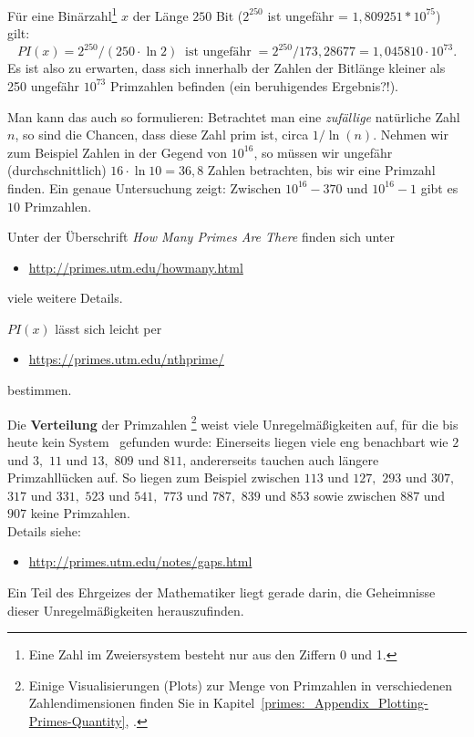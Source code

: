\begin{refsegment}
Für eine Binärzahl\footnote{%
Eine Zahl im Zweiersystem besteht nur aus den Ziffern 0 und 1.
}
$ x $ der Länge $250$ Bit
($2^{250}$ ist ungefähr = $1,809 251 * 10^{75}$)
gilt:
$$ PI(x) = 2^{250} / (250 \cdot \ln 2) \; \;  \mbox{ist~ungefähr}
\; = 2^{250} / 173,28677 = 1,045 810 \cdot 10^{73}. $$
Es ist also zu erwarten, dass sich innerhalb der Zahlen der
Bitlänge kleiner als 250 ungefähr $10^{73}$ Primzahlen
befinden (ein beruhigendes Ergebnis?!).

Man kann das auch so formulieren: Betrachtet man eine {\em zufällige} natürliche Zahl $n$, so sind die
Chancen, dass diese Zahl prim ist, circa $1 / \ln(n)$. Nehmen wir zum Beispiel Zahlen in der Gegend von
$10^{16}$, so müssen wir ungefähr (durchschnittlich) $ 16 \cdot \ln 10 = 36,8 $
Zahlen betrachten, bis wir eine Primzahl finden.
Ein genaue Untersuchung zeigt: Zwischen $10^{16}-370$ und $10^{16}-1$ gibt es $10$
Primzahlen.

Unter der Überschrift {\em How Many Primes Are There} finden sich unter
\vspace{-10pt}
\begin{itemize}
  \item[] \url{http://primes.utm.edu/howmany.html}
\end{itemize}
\vspace{-10pt}
viele weitere Details.

$PI(x)$ lässt sich leicht per
\vspace{-10pt}
\begin{itemize}
	\item[] \url{https://primes.utm.edu/nthprime/}
\end{itemize}
\vspace{-10pt}
bestimmen.


Die \textbf{Verteilung} der Primzahlen%
\footnote{%
    Einige Visualisierungen (Plots) zur Menge von Primzahlen in verschiedenen
    Zahlendimensionen finden Sie in
    Kapitel~\ref{primes:_Appendix_Plotting-Primes-Quantity},
    \glqq {}\grqq.
} weist viele
Unregelmäßigkeiten auf, für die bis heute kein \glqq System\grqq~
gefunden wurde: Einerseits liegen viele eng benachbart wie $2$ und
$3,$ $ 11$ und $13, $ $ 809$ und $811$, andererseits tauchen auch
längere Primzahllücken auf. So liegen zum Beispiel zwischen
$113$ und $127, $ $ 293$ und $307, $ $317$ und $331, $ $ 523$ und
$541, $ $ 773$ und $787, $ $ 839$ und $853$ sowie zwischen $887$
und $907$ keine Primzahlen. \\
Details siehe:
\vspace{-10pt}
\begin{itemize}
  \item[] \url{http://primes.utm.edu/notes/gaps.html}
\end{itemize}
Ein Teil des Ehrgeizes der Mathematiker liegt gerade darin,
die Geheimnisse dieser Unregelmäßigkeiten herauszufinden.



\end{refsegment}
